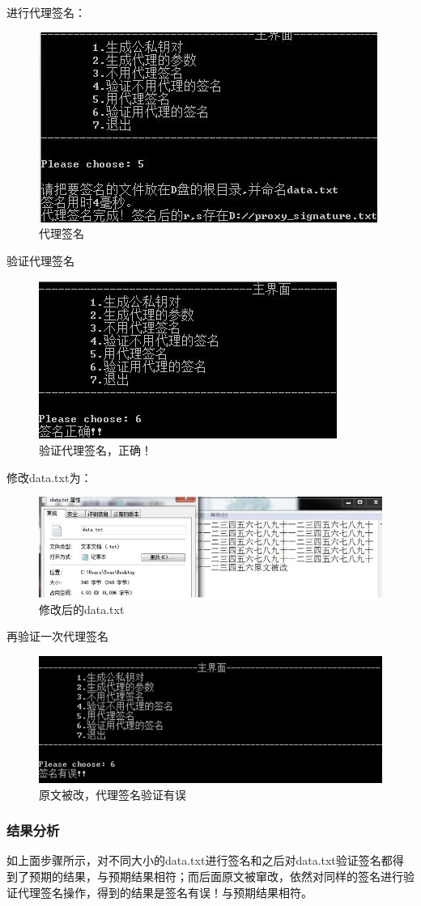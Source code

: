 进行代理签名：

\begin{figure}[H]
\centering
\includegraphics{img/31.jpg}
\caption{代理签名}
\end{figure}

验证代理签名

\begin{figure}[H]
\centering
\includegraphics{img/32.jpg}
\caption{验证代理签名，正确！}
\end{figure}

修改data.txt为：

\begin{figure}[H]
\centering
\includegraphics{img/33.jpg}
\caption{修改后的data.txt}
\end{figure}

再验证一次代理签名

\begin{figure}[H]
\centering
\includegraphics{img/34.jpg}
\caption{原文被改，代理签名验证有误}
\end{figure}

\subsubsection{结果分析}

如上面步骤所示，对不同大小的data.txt进行签名和之后对data\cite{Designated}.txt验证签名都得到了预期的结果，与预期结果相符；而后面原文被窜改，依然对同样的签名进行验证代理签名操作，得到的结果是签名有误！与预期结果相符\cite{计算机密码学及其应用}。